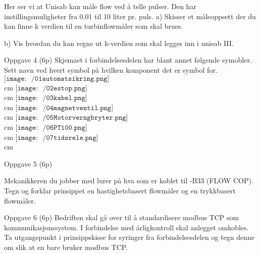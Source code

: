 \vskip 15pt 
Her ser vi at Unisab kan måle flow ved  å telle pulser. Den har instillingsmuligheter fra 0.01 til 10 liter pr. puls. 
\vskip 5pt 
a) Skisser et måleoppsett der du kan finne k verdien til en turbinflowmåler som skal brues. 

\vskip 10pt 
b) Vis hvordan du kan regne ut k-verdien som skal legges inn i unisab III. 

\vskip 2.5pt 
\vskip 2.5pt 
\newpage
Oppgave 4 (6p)
\vskip 2.5pt 
Skjemaet i forbindelsesdelen har blant annet følgende symobler. Sett navn ved hvert symbol på hvilken komponent det er symbol for. \\
$\texttt{[image: ~/01automatsikring.png]}$\\
 cm
$\texttt{[image: ~/02estop.png]}$\\
 cm
$\texttt{[image: ~/03kabel.png]}$\\
 cm
$\texttt{[image: ~/04magnetventil.png]}$\\
 cm
$\texttt{[image: ~/05Motorverngbryter.png]}$\\
 cm
$\texttt{[image: ~/06PT100.png]}$\\
 cm
$\texttt{[image: ~/07tidsrele.png]}$\\
 cm
\vskip 2.5pt 
\vskip 2.5pt 
\newpage
Oppgave 5 (6p) %

\vskip 2.5pt 
Mekanikkeren du jobber med lurer på hva som  er koblet til -B33 (FLOW COP). Tegn og forklar prinsippet en hastighetsbasert flowmåler og en trykkbasert flowmåler. 
\vskip 2.5pt 
\vskip 2.5pt 
\vfil \eject

Oppgave 6 (6p) %
\vskip 2.5pt 
Bedriften skal gå over til å standardisere modbus TCP som kommunikasjonssystem. I forbindelse med årligkontroll skal anlegget omkobles. Ta utgangspunkt i prinsippskisse for syringer fra forbindelsesdelen og tegn denne om slik at en bare bruker modbus TCP. 


